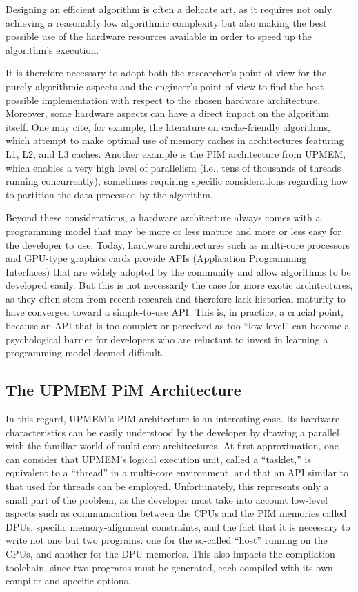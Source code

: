 Designing an efficient algorithm is often a delicate art, as it requires not only achieving a reasonably low algorithmic complexity but also making the best possible use of the hardware resources available in order to speed up the algorithm’s execution.

It is therefore necessary to adopt both the researcher’s point of view for the purely algorithmic aspects and the engineer’s point of view to find the best possible implementation with respect to the chosen hardware architecture. Moreover, some hardware aspects can have a direct impact on the algorithm itself. One may cite, for example, the literature on cache-friendly algorithms, which attempt to make optimal use of memory caches in architectures featuring L1, L2, and L3 caches. Another example is the PIM architecture from UPMEM, which enables a very high level of parallelism (i.e., tens of thousands of threads running concurrently), sometimes requiring specific considerations regarding how to partition the data processed by the algorithm.

Beyond these considerations, a hardware architecture always comes with a programming model that may be more or less mature and more or less easy for the developer to use. Today, hardware architectures such as multi-core processors and GPU-type graphics cards provide APIs (Application Programming Interfaces) that are widely adopted by the community and allow algorithms to be developed easily. But this is not necessarily the case for more exotic architectures, as they often stem from recent research and therefore lack historical maturity to have converged toward a simple-to-use API. This is, in practice, a crucial point, because an API that is too complex or perceived as too “low-level” can become a psychological barrier for developers who are reluctant to invest in learning a programming model deemed difficult.

\subsection{The UPMEM PiM Architecture}

In this regard, UPMEM’s PIM architecture is an interesting case. Its hardware characteristics can be easily understood by the developer by drawing a parallel with the familiar world of multi-core architectures. At first approximation, one can consider that UPMEM’s logical execution unit, called a “tasklet,” is equivalent to a “thread” in a multi-core environment, and that an API similar to that used for threads can be employed. Unfortunately, this represents only a small part of the problem, as the developer must take into account low-level aspects such as communication between the CPUs and the PIM memories called DPUs, specific memory-alignment constraints, and the fact that it is necessary to write not one but two programs: one for the so-called “host” running on the CPUs, and another for the DPU memories. This also impacts the compilation toolchain, since two programs must be generated, each compiled with its own compiler and specific options.

